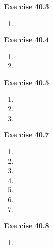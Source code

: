 




\textbf{Exercise 40.3}
\begin{enumerate}
    \item 
\end{enumerate}

\textbf{Exercise 40.4}
\begin{enumerate}
    \item 
    \item 
\end{enumerate}

\textbf{Exercise 40.5}
\begin{enumerate}
    \item 
    \item 
    \item 
\end{enumerate}

\textbf{Exercise 40.7}
\begin{enumerate}
    \item 
    \item 
    \item 
    \item 
    \item 
    \item 
    \item 
\end{enumerate}

\textbf{Exercise 40.8}
\begin{enumerate}
    \item 
\end{enumerate}

